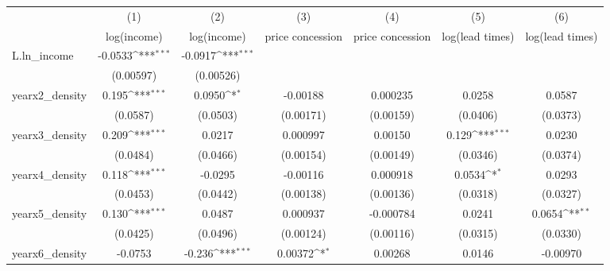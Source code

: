 {
\def\sym#1{\ifmmode^{#1}\else\(^{#1}\)\fi}
\begin{tabular}{l*{6}{c}}
\toprule
            &\multicolumn{1}{c}{(1)}&\multicolumn{1}{c}{(2)}&\multicolumn{1}{c}{(3)}&\multicolumn{1}{c}{(4)}&\multicolumn{1}{c}{(5)}&\multicolumn{1}{c}{(6)}\\
            &\multicolumn{1}{c}{log(income)}&\multicolumn{1}{c}{log(income)}&\multicolumn{1}{c}{price concession}&\multicolumn{1}{c}{price concession}&\multicolumn{1}{c}{log(lead times)}&\multicolumn{1}{c}{log(lead times)}\\
\midrule
L.ln\_income &     -0.0533\sym{***}&     -0.0917\sym{***}&                     &                     &                     &                     \\
            &   (0.00597)         &   (0.00526)         &                     &                     &                     &                     \\
\addlinespace
yearx2\_density&       0.195\sym{***}&      0.0950\sym{*}  &    -0.00188         &    0.000235         &      0.0258         &      0.0587         \\
            &    (0.0587)         &    (0.0503)         &   (0.00171)         &   (0.00159)         &    (0.0406)         &    (0.0373)         \\
\addlinespace
yearx3\_density&       0.209\sym{***}&      0.0217         &    0.000997         &     0.00150         &       0.129\sym{***}&      0.0230         \\
            &    (0.0484)         &    (0.0466)         &   (0.00154)         &   (0.00149)         &    (0.0346)         &    (0.0374)         \\
\addlinespace
yearx4\_density&       0.118\sym{***}&     -0.0295         &    -0.00116         &    0.000918         &      0.0534\sym{*}  &      0.0293         \\
            &    (0.0453)         &    (0.0442)         &   (0.00138)         &   (0.00136)         &    (0.0318)         &    (0.0327)         \\
\addlinespace
yearx5\_density&       0.130\sym{***}&      0.0487         &    0.000937         &   -0.000784         &      0.0241         &      0.0654\sym{**} \\
            &    (0.0425)         &    (0.0496)         &   (0.00124)         &   (0.00116)         &    (0.0315)         &    (0.0330)         \\
\addlinespace
yearx6\_density&     -0.0753         &      -0.236\sym{***}&     0.00372\sym{*}  &     0.00268         &      0.0146         &    -0.00970         \\

\end{tabular}}
